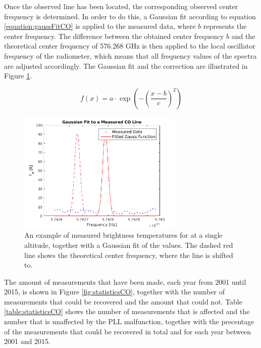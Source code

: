 Once the observed  line has been located, the corresponding observed center frequency is determined. In order to do this, a Gaussian fit according to equation \eqref{equation:gaussFitCO} is applied to the measured data, where $b$ represents the center frequency. The difference between the obtained center frequency $b$ and the theoretical center frequency of 576.268 GHz is then applied to the local oscillator frequency of the radiometer, which means that all frequency values of the spectra are adjusted accordingly. The Gaussian fit and the correction are illustrated in Figure \ref{fig:gaussFitCO}.

\begin{equation}
    \label{equation:gaussFitCO}
    f(x) = a\cdot \exp \left (- \left (\frac{x-b}{c} \right )^2 \right )
\end{equation}

\begin{figure}[ht!]
\begin{center}
\includegraphics[width=0.7\textwidth]{freq_corr_gaussFit.png}
\caption{An example of measured brightness temperatures for  at a single altitude, together with a Gaussian fit of the values. The dashed red line shows the theoretical center frequency, where the line is shifted to.}
\label{fig:gaussFitCO}
\end{center}
\end{figure}

The amount of measurements that have been made, each year from 2001 until 2015, is shown in Figure \ref{fig:statisticsCO}, together with the number of measurements that could be recovered and the amount that could not. Table \ref{table:statisticsCO} shows the number of measurements that is affected and the number that is unaffected by the PLL malfunction, together with the precentage of the measurements that could be recovered in total and for each year between 2001 and 2015.

